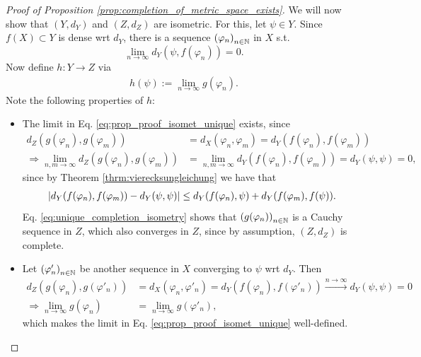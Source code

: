 \begin{proof}[Proof of Proposition \ref{prop:completion_of_metric_space_exists}]
	We will now show that $(Y, d_Y)$ and $(Z, d_Z)$ are isometric. For this, let $\psi\in Y$. Since $f(X)\subset Y$ is dense wrt $d_Y$, there is a sequence $\seq[\varphi_n]$ in $X$ s.t. $$\lim\limits_{n\to\infty}d_Y(\psi, f(\varphi_n)) = 0.$$ Now define $h: Y\to Z$ via
	\begin{align}\label{eq:prop_proof_isomet_unique}
		h(\psi) := \lim\limits_{n\to\infty}g(\varphi_n).
	\end{align}
	Note the following properties of $h$:
	\begin{itemize}
		\item The limit in Eq. \eqref{eq:prop_proof_isomet_unique} exists, since
		\begin{align}
			d_Z(g(\varphi_n), g(\varphi_m)) &= d_X(\varphi_n, \varphi_m) = d_Y(f(\varphi_n), f(\varphi_m))
			\\ \label{eq:unique_completion_isometry} \Rightarrow \lim\limits_{n, m\to\infty}d_Z(g(\varphi_n), g(\varphi_m)) &= \lim\limits_{n, m\to\infty} d_Y(f(\varphi_n), f(\varphi_m)) = d_Y(\psi, \psi) = 0,
		\end{align}
		since by Theorem \ref{thrm:vierecksungleichung} we have that
		\begin{align*}
			\abs{d_Y(f(\varphi_n), f(\varphi_m)) - d_Y(\psi, \psi)} \leq d_Y(f(\varphi_n), \psi) + d_Y(f(\varphi_m), f(\psi)).
		\end{align*}
		Eq. \eqref{eq:unique_completion_isometry} shows that $\seq[g(\varphi_n)]$ is a Cauchy sequence in $Z$, which also converges in $Z$, since by assumption, $(Z, d_Z)$ is complete.
		
		\item Let $\seq[\varphi'_n]$ be another sequence in $X$ converging to $\psi$ wrt $d_Y$. Then
		\begin{align*}
			d_Z(g(\varphi_n), g(\varphi'_n)) &= d_X(\varphi_n, \varphi'_n) = d_Y(f(\varphi_n), f(\varphi'_n)) \overset{n\to\infty}{\longrightarrow} d_Y(\psi, \psi) = 0
			\\ \Rightarrow \lim\limits_{n\to\infty}g(\varphi_n) &= \lim\limits_{n\to\infty}g(\varphi'_n),
		\end{align*}
		which makes the limit in Eq. \eqref{eq:prop_proof_isomet_unique} well-defined.
		

\end{itemize}
\end{proof}
